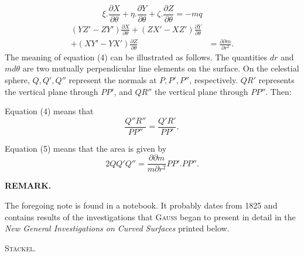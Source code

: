 %
\noindent [we have:]
\begin{equation}\tag{4}
\xi.\frac{\partial X}{\partial\theta}+\eta.\frac{\partial Y}{\partial\theta}+\zeta.\frac{\partial Z}{\partial\theta}=-mq
\end{equation}
\noindent [and]
\begin{equation}\tag{5}
\begin{aligned}
(YZ'-ZY')\frac{\partial X}{\partial\theta}+(ZX'-XZ')\frac{\partial Y}{\partial\theta}&\\
+(XY'-YX')\frac{\partial Z}{\partial\theta}&=\frac{\partial\partial m}{\partial r^2}.
\end{aligned}
\end{equation}
\indent The meaning of equation (4) can be illustrated as follows. The quantities $dr$ and $md\theta$ are two mutually perpendicular line elements on the surface. On the celestial sphere, $Q,Q',Q''$ represent the normals at $P,P',P''$, respectively. $QR'$ represents the vertical plane through $PP'$, and $QR''$ the vertical plane through $PP''$. Then:
\begin{center}\end{center}
\noindent\hspace*{1.2em}Equation (4) means that
\[
\frac{Q''R''}{PP''}=\frac{Q'R'}{PP'},
\]
\begin{center}\end{center}
\noindent\hspace*{1.2em}Equation (5) means that the area is given by
\[
2QQ'Q''=\frac{\partial\partial m}{m\partial r^2}PP'.PP''.
\]
\par{}\begin{center}\textbf{REMARK.}\end{center}
\noindent\hspace*{1.2em}The foregoing note is found in a notebook. It probably dates from 1825 and contains results of the investigations that \textsc{Gauss} began to present in detail in the \textit{New General Investigations on Curved Surfaces} printed below.
\begin{flushright}\textsc{Stäckel}.\end{flushright}
